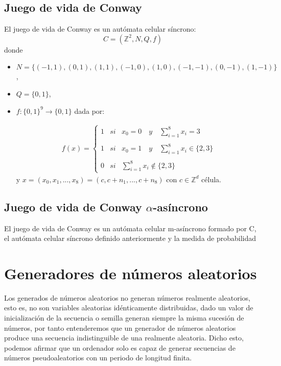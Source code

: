 \documentclass[../proyecto.tex]{memoir}
\begin{document}
\subsection{Juego de vida de Conway}

\begin{defi}
El juego de vida de Conway es un autómata celular síncrono: $$
C = (\mathds{Z}^{2}, N, Q, f)
$$
donde
\begin{itemize}
\item $N=\{(-1, 1), (0, 1), (1, 1), (-1, 0), (1, 0), (-1,-1), (0,-1), (1,-1) \}$,
\item $Q=\{0,1\}$,
\item $f:\{0,1\}^{9} \rightarrow \{0,1\} $ dada por:

\begin{align*}
f(x)= \left\{ \begin{array}{lcc}
             1 &   si  & x_{0}=0 \quad y \quad \sum_{i=1}^{8} x_i = 3 \\
             \\ 1 & si & x_{0}=1 \quad y \quad \sum_{i=1}^{8} x_i \in \{2 ,3\} \\
             \\ 0 &  si  & \sum_{i=1}^{8} x_i \notin \{2, 3\} \
             \end{array}
   \right. 
\end{align*}
y $x = (x_{0}, x_{1}, ...,x_{8}) = (c,c+n_{1},...,c+n_{8})$ con $c \in \mathds{Z} ^{d}$ célula.

\end{itemize}
\end{defi}

\subsection{Juego de vida de Conway $\alpha$-asíncrono}
\begin{defi}
El juego de vida de Conway es un autómata celular m-asíncrono formado por C, el autómata celular síncrono definido anteriormente y la medida de probabilidad 
\end{defi}


\section{Generadores de números aleatorios}

Los generados de números aleatorios no generan números realmente aleatorios, esto es, no son variables aleatorias idénticamente distribuidas, dado un valor de inicialización de la secuencia o semilla generan siempre la misma sucesión de números, por tanto entenderemos que un generador de números aleatorios produce una secuencia indistinguible de una realmente aleatoria. Dicho esto, podemos afirmar que un ordenador solo es capaz de generar secuencias de números pseudoaleatorios con un periodo de longitud finita.
\end{document}
